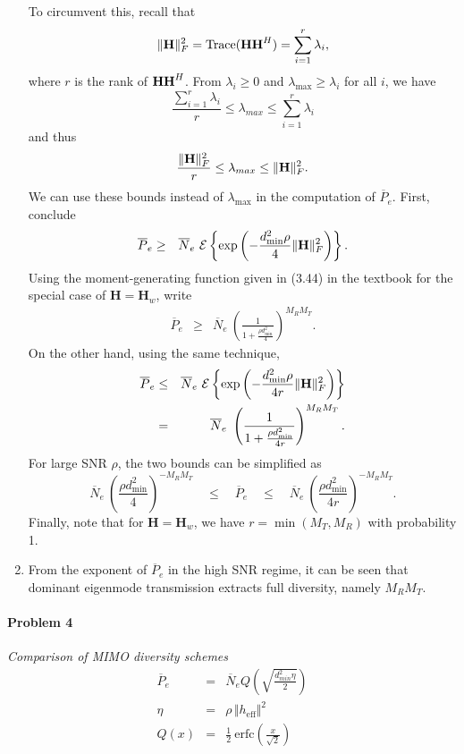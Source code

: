 \documentclass[12pt]{article}
\begin{document}
\begin{enumerate}
To circumvent this, recall that
\begin{eqnarray*}
\Vert {\bf H}\Vert _F^2 = \mathrm{Trace} ({\bf H H}^H) = \sum_{i=1}^r \lambda_i,
\end{eqnarray*}
where $r$ is the rank of ${\bf H H}^H$. From $\lambda_i\geq 0$ and $\lambda_\text{max}\geq \lambda_i$ for all $i$, we have
$$
\frac{\sum_{i=1}^r \lambda_i}{r} \le  \lambda_{max} \le \sum_{i=1}^r \lambda_i
$$ 
and thus
$$
\frac{\Vert  {\bf H}\Vert  _F^2 }{r} \le  \lambda_{max} \le  \Vert  {\bf H}\Vert  _F^2.
$$
We can use these bounds instead of $\lambda_\text{max}$ in the computation of $\overline P_e$. First, conclude
\begin{eqnarray*}
\overline P_e &\geq & \overline N_e\  \mathcal E \left\{ \exp \left( -\frac{d_\text{min}^2 \rho}{4} \Vert  {\bf H}\Vert  _F^2 \right) \right\}.
\end{eqnarray*}
Using the moment-generating function given in (3.44) in the textbook for the special case of $\mathbf H = \mathbf H_w$, write 
\begin{eqnarray*}
\overline P_e &\geq & \overline N_e\  \left( 
	\frac{1}{1+  \frac{ \rho d_\text{min}^2 }{4}   } 
	\right ) ^{M_R M_T}.
\end{eqnarray*}
On the other hand, using the same technique,
\begin{eqnarray*}
\overline P_e &\leq & \overline N_e\  \mathcal E \left\{ \exp \left( -\frac{d_\text{min}^2 \rho}{4r} \Vert  {\bf H}\Vert  _F^2 \right) \right\} \\
&=&\overline N_e\  \left( 
	\frac{1}{1+  \frac {\rho d_\text{min}^2 }{4r}   } 
	\right ) ^{M_R M_T}.
\end{eqnarray*}
For large SNR $\rho$, the two bounds can be simplified as 
$$
\overline N_e\  \left( 
	\frac{ \rho d_\text{min}^2 }{4}   
	\right ) ^{-M_R M_T}
\quad \leq\quad
\overline P_e
\quad \leq\quad
\overline N_e\  \left( 
	\frac{ \rho d_\text{min}^2 }{4r}   
	\right ) ^{-M_R M_T}.
$$
Finally, note that for $\mathbf H=\mathbf H_w$, we have $r = \min(M_T,M_R)$ with probability 1.

\item
From the exponent of $  {\overline P_e} $ in the high SNR regime, it can be seen that dominant eigenmode transmission extracts full diversity, namely $M_R M_T$.
\end{enumerate}


\paragraph{Problem 4} { \it Comparison of MIMO diversity schemes}
\begin{eqnarray*}
{\overline P_e} &= & {\overline N_e}  Q \left ( \sqrt{\frac{  d_{min}^2 \eta }{2}} \right) \\
\eta & = & \rho \, \Vert h_\text{eff}\Vert ^2\\
Q(x) & = & \frac 1 2 \ \mathrm{erfc} \left(\frac{x}{\sqrt{2}} \right)
\end{eqnarray*}
\end{document}
